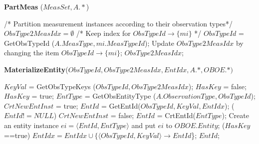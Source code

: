 \documentclass[10pt]{article}
\begin{document}
\begin{algorithm} [htb]
\caption{{\bf PartMeas} ($MeasSet, A.*$)}
{\small
\begin{algorithmic}
    \STATE /* Partition measurement instances according to their observation types*/
    \STATE $ObsType2MeasIdx=\emptyset$ /* Keep index for $ObsTypeId \rightarrow \{mi\}$ */
    \STATE $ObsTypeId$ = GetObsTypeId ($A.MeasType, mi.MeasTypeId$);
	\STATE Update $ObsType2MeasIdx$ by changing the item $ObsTypeId \rightarrow \{mi\}$;
    \ENDFOR
    \RETURN $ObsType2MeasIdx$;
\end{algorithmic}
}
\end{algorithm}

\begin{algorithm} [htb]
\caption{{\bf MaterializeEntity}($ObsTypeId, ObsType2MeasIdx, EntIdx, A.*, OBOE.*)$}
{\small
\begin{algorithmic}
\STATE $KeyVal$ = GetObsTypeKeys ($ObsTypeId, ObsType2MeasIdx$);
\STATE $HasKey$ = false;
     $HasKey$ = true;
\STATE $EntType$ = GetObsEntityType ($A.ObservationType, ObsTypeId$);
\STATE $CrtNewEntInst$ = true;
	\STATE $EntId$ = GetEntId($ObsTypeId, KeyVal, EntIdx$); %
	 {($EntId!=NULL$)} $CrtNewEntInst$ = false;
\ENDIF
{}
	\STATE $EntId$ = CrtEntId($EntType$);
	\STATE Create an entity instance $ei = \langle EntId, EntType\rangle $ and put $ei$ to $OBOE.Entity$;
	 ($HasKey$==true) $EntIdx = EntIdx \cup \{\langle ObsTypeId, KeyVal \rangle \rightarrow EntId$\};
\ENDIF
\RETURN $EntId$;
\end{algorithmic}
}
\end{algorithm}
\end{document}

